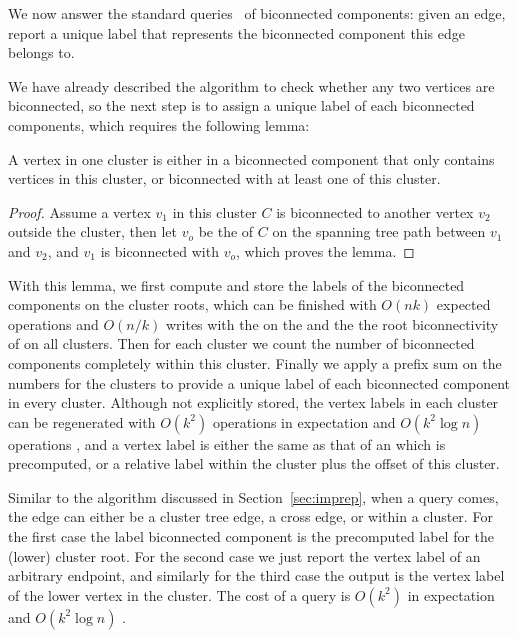   We now answer the standard queries~\cite{CLRS,JaJa92} of biconnected components: given an edge, report a unique label that represents the biconnected component this edge belongs to.

We have already described the algorithm to check whether any two vertices are biconnected, so the next step is to assign a unique label of each biconnected components, which requires the following lemma:
\begin{lemma}
A vertex in one cluster is either in a biconnected component that only contains vertices in this cluster, or biconnected with at least one \outver{} of this cluster.
\end{lemma}
\begin{proof}
Assume a vertex $v_1$ in this cluster $C$ is biconnected to another vertex $v_2$ outside the cluster, then let $v_o$ be the \outver{} of $C$ on the spanning tree path between $v_1$ and $v_2$, and $v_1$ is biconnected with $v_o$, which proves the lemma.
\end{proof}

With this lemma, we first compute and store the labels of the biconnected components on the cluster roots, which can be finished with $O(nk)$ expected operations and $O(n/k)$ writes with the \imprep{} on the \clustergraph{} and the the root biconnectivity of \outvers{} on all clusters.
Then for each cluster we count the number of biconnected components completely within this cluster.
Finally we apply a prefix sum on the numbers for the clusters to provide a unique label of each biconnected component in every cluster.
Although not explicitly stored, the vertex labels in each cluster can be regenerated with $O(k^2)$ operations in expectation and $O(k^2\log n)$ operations \whp{}, and a vertex label is either the same as that of an \outver{} which is precomputed, or a relative label within the cluster plus the offset of this cluster.

Similar to the algorithm discussed in Section~\ref{sec:imprep}, when a query comes, the edge can either be a cluster tree edge, a cross edge, or within a cluster.
For the first case the label biconnected component is the precomputed label for the (lower) cluster root.
For the second case we just report the vertex label of an arbitrary endpoint, and similarly for the third case the output is the vertex label of the lower vertex in the cluster.
The cost of a query is $O(k^2)$ in expectation and $O(k^2\log n)$ \whp{}.

